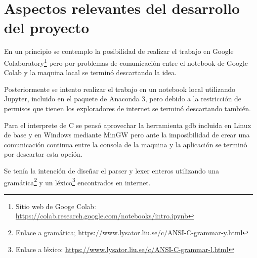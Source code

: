 \chapter{Aspectos relevantes del desarrollo del proyecto}

En un principio se contemplo la posibilidad de realizar el trabajo en Google Colaboratory\footnote{Sitio web de Googe Colab: \url{https://colab.research.google.com/notebooks/intro.ipynb}} pero por problemas de comunicación entre el notebook de Google Colab y la maquina local se terminó descartando la idea.

Posteriormente se intento realizar el trabajo en un notebook local utilizando Jupyter, incluido en el paquete de Anaconda 3, pero debido a la restricción de permisos que tienen los exploradores de internet se terminó descartando también.

Para el interprete de C se pensó aprovechar la herramienta gdb incluida en Linux de base y en Windows mediante MinGW pero ante la imposibilidad de crear una comunicación continua entre la consola de la maquina y la aplicación se terminó por descartar esta opción.

Se tenía la intención de diseñar el parser y lexer enteros utilizando una gramática\footnote{Enlace a gramática; \url{https://www.lysator.liu.se/c/ANSI-C-grammar-y.html}} y un léxico\footnote{Enlace a léxico: \url{https://www.lysator.liu.se/c/ANSI-C-grammar-l.html}} encontrados en internet.